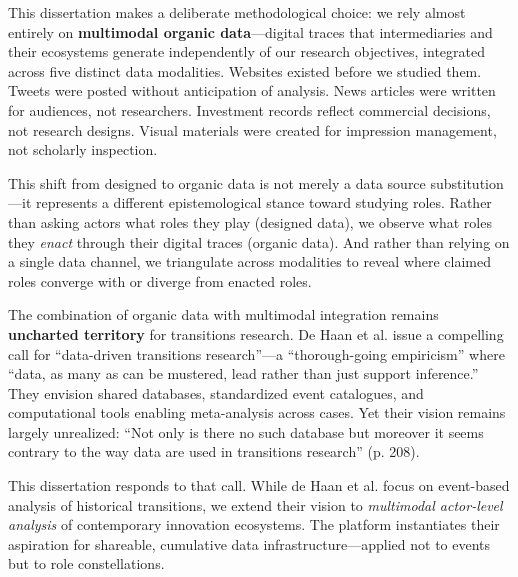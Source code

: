 \documentclass[../main.tex]{subfiles}
\begin{document}
\begin{insightbox}
This dissertation makes a deliberate methodological choice: we rely almost entirely on \textbf{multimodal organic data}---digital traces that intermediaries and their ecosystems generate independently of our research objectives, integrated across five distinct data modalities. Websites existed before we studied them. Tweets were posted without anticipation of analysis. News articles were written for audiences, not researchers. Investment records reflect commercial decisions, not research designs. Visual materials were created for impression management, not scholarly inspection.

This shift from designed to organic data is not merely a data source substitution---it represents a different epistemological stance toward studying roles. Rather than asking actors what roles they play (designed data), we observe what roles they \emph{enact} through their digital traces (organic data). And rather than relying on a single data channel, we triangulate across modalities to reveal where claimed roles converge with or diverge from enacted roles.
\end{insightbox}

The combination of organic data with multimodal integration remains \textbf{uncharted territory} for transitions research. De Haan et al. \citeyear{dehaan2019datadriven} issue a compelling call for ``data-driven transitions research''---a ``thorough-going empiricism'' where ``data, as many as can be mustered, lead rather than just support inference.'' They envision shared databases, standardized event catalogues, and computational tools enabling meta-analysis across cases. Yet their vision remains largely unrealized: ``Not only is there no such database but moreover it seems contrary to the way data are used in transitions research'' (p. 208).

This dissertation responds to that call. While de Haan et al. focus on event-based analysis of historical transitions, we extend their vision to \emph{multimodal actor-level analysis} of contemporary innovation ecosystems. The \RoleBox{} platform instantiates their aspiration for shareable, cumulative data infrastructure---applied not to events but to role constellations.
\end{document}
